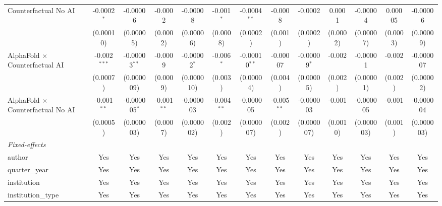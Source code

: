 \begin{tabular}{lcccccccccccc}
   Counterfactual No AI                     & -0.0002$^{*}$  & -0.00006        & -0.0002       & -0.00008       & -0.001$^{*}$  & -0.0004$^{**}$  & -0.0008       & -0.0002        & 0.0001         & -0.00004   & 0.00005      & -0.00006\\   
                                            & (0.00010)      & (0.00005)       & (0.0002)      & (0.00006)      & (0.0008)      & (0.0002)        & (0.001)       & (0.0002)       & (0.0002)       & (0.00007)  & (0.0003)     & (0.00009)\\   
   AlphaFold $\times$ Counterfactual AI     & -0.002$^{***}$ & -0.00003$^{**}$ & -0.0009       & -0.00002$^{*}$ & -0.006$^{*}$  & -0.00010$^{**}$ & -0.00007      & -0.00009$^{*}$ & -0.002         & -0.00001   & -0.002       & -0.000007\\   
                                            & (0.0007)       & (0.000009)      & (0.0009)      & (0.000010)     & (0.003)       & (0.00004)       & (0.004)       & (0.00005)      & (0.002)        & (0.00001)  & (0.002)      & (0.00002)\\   
   AlphaFold $\times$ Counterfactual No AI  & -0.001$^{**}$  & -0.000005$^{*}$ & -0.001$^{**}$ & -0.000003      & -0.004$^{**}$ & -0.000005       & -0.005$^{**}$ & -0.000003      & -0.001         & -0.000005  & -0.001       & -0.000004\\   
                                            & (0.0005)       & (0.000003)      & (0.0007)      & (0.000002)     & (0.002)       & (0.000007)      & (0.002)       & (0.000007)     & (0.0010)       & (0.000003) & (0.001)      & (0.000003)\\   
   \midrule
   \emph{Fixed-effects}\\
   author                                   & Yes            & Yes             & Yes           & Yes            & Yes           & Yes             & Yes           & Yes            & Yes            & Yes        & Yes          & Yes\\  
   quarter\_year                            & Yes            & Yes             & Yes           & Yes            & Yes           & Yes             & Yes           & Yes            & Yes            & Yes        & Yes          & Yes\\  
   institution                              & Yes            & Yes             & Yes           & Yes            & Yes           & Yes             & Yes           & Yes            & Yes            & Yes        & Yes          & Yes\\  
   institution\_type                        & Yes            & Yes             & Yes           & Yes            & Yes           & Yes             & Yes           & Yes            & Yes            & Yes        & Yes          & Yes\\  

\end{tabular}
